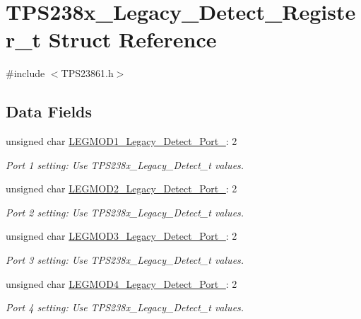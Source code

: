 \hypertarget{struct_t_p_s238x___legacy___detect___register__t}{\section{T\-P\-S238x\-\_\-\-Legacy\-\_\-\-Detect\-\_\-\-Register\-\_\-t Struct Reference}
\label{struct_t_p_s238x___legacy___detect___register__t}
}


{\ttfamily \#include $<$T\-P\-S23861.\-h$>$}

\subsection*{Data Fields}
\begin{DoxyCompactItemize}
\item 
unsigned char \hyperlink{struct_t_p_s238x___legacy___detect___register__t_ad94e0297bc8ebfad0329c43a2a9cb78a}{L\-E\-G\-M\-O\-D1\-\_\-\-Legacy\-\_\-\-Detect\-\_\-\-Port\-\_}\-: 2
\begin{DoxyCompactList}\small\item\em Port 1 setting\-: Use T\-P\-S238x\-\_\-\-Legacy\-\_\-\-Detect\-\_\-t values. \end{DoxyCompactList}\item 
unsigned char \hyperlink{struct_t_p_s238x___legacy___detect___register__t_a909aa93edfd901520efdec0cf68d229c}{L\-E\-G\-M\-O\-D2\-\_\-\-Legacy\-\_\-\-Detect\-\_\-\-Port\-\_}\-: 2
\begin{DoxyCompactList}\small\item\em Port 2 setting\-: Use T\-P\-S238x\-\_\-\-Legacy\-\_\-\-Detect\-\_\-t values. \end{DoxyCompactList}\item 
unsigned char \hyperlink{struct_t_p_s238x___legacy___detect___register__t_a6b80e1e553d2a514fa74657eb4336b7c}{L\-E\-G\-M\-O\-D3\-\_\-\-Legacy\-\_\-\-Detect\-\_\-\-Port\-\_}\-: 2
\begin{DoxyCompactList}\small\item\em Port 3 setting\-: Use T\-P\-S238x\-\_\-\-Legacy\-\_\-\-Detect\-\_\-t values. \end{DoxyCompactList}\item 
unsigned char \hyperlink{struct_t_p_s238x___legacy___detect___register__t_a8413d8a277d91edc53da8b44c7ea6691}{L\-E\-G\-M\-O\-D4\-\_\-\-Legacy\-\_\-\-Detect\-\_\-\-Port\-\_}\-: 2
\begin{DoxyCompactList}\small\item\em Port 4 setting\-: Use T\-P\-S238x\-\_\-\-Legacy\-\_\-\-Detect\-\_\-t values. \end{DoxyCompactList}\end{DoxyCompactItemize}


